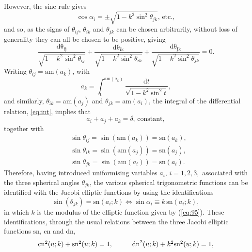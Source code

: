 \documentclass[fleqn,11pt,twoside]{article}
\theoremstyle{definition}
\begin{document}
However, the sine rule gives
\begin{equation}
\cos\alpha_i=\pm\sqrt{1-k^2\sin^2\theta_{jk}},\, \mathrm{etc.},
\end{equation}
and so, as the signs of $\theta_{ij}$, $\theta_{ik}$ and $\theta_{jk}$ can be chosen arbitrarily, without loss of generality they can all be chosen to be positive, giving
\begin{equation}
\label{eq:int}
\frac{\mathrm{d\theta_{ij}}}{\sqrt{1-k^2\sin^2\theta_{ij}}}+\frac{\mathrm{d\theta_{ik}}}{\sqrt{1-k^2\sin^2\theta_{ik}}}+\frac{\mathrm{d\theta_{jk}}}{\sqrt{1-k^2\sin^2\theta_{jk}}}=0. 
\end{equation}
Writing $\theta_{ij}=\mathrm{am}(a_k)$, with
\begin{equation}
a_k=\int_{0}^{\mathrm{am}(a_k)}\frac{\mathrm{d}t}{\sqrt{1-k^2\sin^2t}},
\end{equation}
and similarly,  $\theta_{ik}=\mathrm{am}(a_j)$ and  $\theta_{jk}=\mathrm{am}(a_i)$, the integral of the differential relation, \eqref{eq:int}, implies that
\begin{equation}
a_i+a_j+a_k=\delta,\, \mathrm{constant},
\end{equation}
together with
\begin{equation}
\begin{split}
&\sin\theta_{ij}=\sin(\mathrm{am}(a_k))=\mathrm{sn}(a_k),\\
&\sin\theta_{ik}=\sin(\mathrm{am}(a_j))=\mathrm{sn}(a_j),\\
&\sin\theta_{jk}=\sin(\mathrm{am}(a_i))=\mathrm{sn}(a_i).
\end{split}
\end{equation}
Therefore, having introduced uniformising variables $a_i$, $i=1,2,3,$ associated with the three spherical angles $\theta_{jk}$, the various spherical trigonometric functions can be identified with the Jacobi elliptic functions by using the identifications
\begin{equation}\label{eq:106}
\sin(\theta_{jk})=\text{sn}(a_i;k) \iff \sin\alpha_i\equiv k\,\text{sn}(a_i;k),
\end{equation}
in which $k$ is the modulus of the elliptic function given by (\ref{eq:95}). These identifications, through the usual relations between the three Jacobi elliptic functions $\mathrm{sn}$,  $\mathrm{cn}$ and  $\mathrm{dn}$,
\begin{equation}\begin{array}{cc}
\mathrm{cn}^2(u;k)+\mathrm{sn}^2(u;k)=1, \hspace{10mm}\mathrm{dn}^2(u;k)+k^2\mathrm{sn}^2(u;k)=1,\\
\end{array}
\end{equation}
\end{document}

